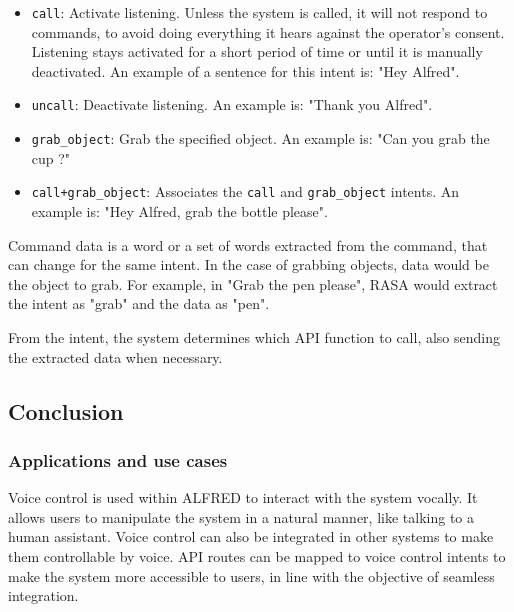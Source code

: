 \begin{itemize}
    \item \lstinline{call}: Activate listening. Unless the system is called, it will not respond to commands, to avoid doing everything it hears against the operator's consent. Listening stays activated for a short period of time or until it is manually deactivated. An example of a sentence for this intent is: "Hey Alfred".
    \item \lstinline{uncall}: Deactivate listening. An example is: "Thank you Alfred".
    \item \lstinline{grab_object}: Grab the specified object. An example is: "Can you grab the cup ?"
    \item \lstinline{call+grab_object}: Associates the \lstinline{call} and \lstinline{grab_object} intents. An example is: "Hey Alfred, grab the bottle please".
\end{itemize}

Command data is a word or a set of words extracted from the command, that can change for the same intent. In the case of grabbing objects, data would be the object to grab. For example, in "Grab the pen please", RASA would extract the intent as "grab" and the data as "pen".

From the intent, the system determines which API function to call, also sending the extracted data when necessary.



\subsection{Conclusion}

\subsubsection{Applications and use cases}

Voice control is used within ALFRED to interact with the system vocally. It allows users to manipulate the system in a natural manner, like talking to a human assistant. Voice control can also be integrated in other systems to make them controllable by voice. API routes can be mapped to voice control intents to make the system more accessible to users, in line with the objective of seamless integration.


